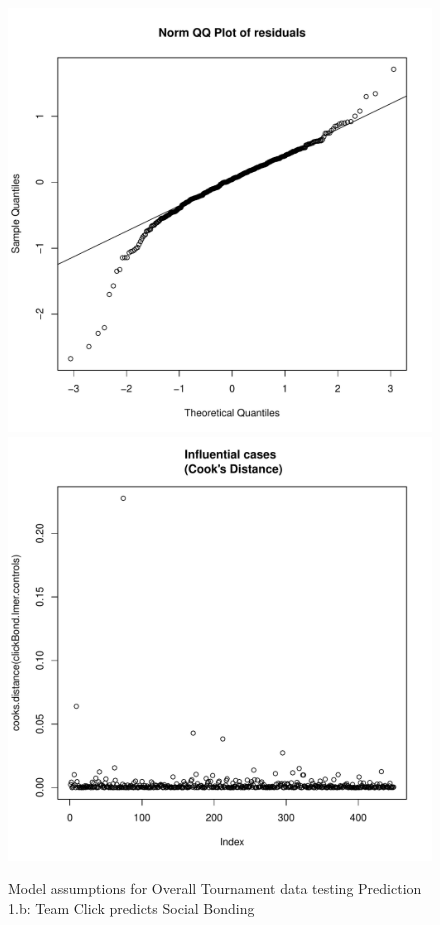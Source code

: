 \begin{CJK}{UTF8}{gbsn}
\begin{figure}[htbp]
              \includegraphics[scale =.4]{images/MLM31bQQNorm.pdf}
              \includegraphics[scale =.4]{images/MLM31bCooksD.pdf}
              \caption{Model assumptions for Overall Tournament data testing Prediction 1.b: Team Click predicts Social Bonding}
              \label{fig:MLM31bAssumptions}
            \end{figure}






\end{CJK}
